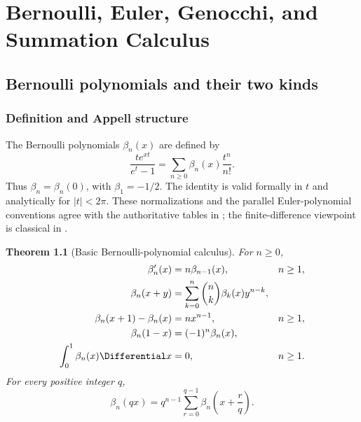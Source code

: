 \documentclass[11pt,a4paper,oneside,openany]{book}
\newtheorem{theorem}{Theorem}[chapter]
\theoremstyle{definition}
\theoremstyle{remark}
\begin{document}
\part{Bernoulli, Euler, Genocchi, and Summation Calculus}
\label{part:classical-polynomials}

\chapter{Bernoulli polynomials and their two kinds}
\label{ch:bernoulli-polynomials}

\section{Definition and Appell structure}

The Bernoulli polynomials $\beta_n(x)$ are defined by
\begin{equation}\label{eq:new-bernoulli-egf}
 \frac{t e^{xt}}{e^t-1}
 =\sum_{n\ge0}\beta_n(x)\frac{t^n}{n!}.
\end{equation}
Thus $\beta_n=\beta_n(0)$, with $\beta_1=-1/2$.  The identity is valid
formally in $t$ and analytically for $|t|<2\pi$.  These normalizations and the
parallel Euler-polynomial conventions agree with the authoritative tables in
\cite{NISTDLMF}; the finite-difference viewpoint is classical in
\cite{Norlund1924}.

\begin{theorem}[Basic Bernoulli-polynomial calculus]\label{thm:new-bernoulli-basic}
For $n\ge0$,
\begin{align}
 \beta_n'(x)&=n\beta_{n-1}(x), &&n\ge1,
 \label{eq:new-bernoulli-derivative}\\
 \beta_n(x+y)&=\sum_{k=0}^n\binom nk\beta_k(x)y^{n-k},
 \label{eq:new-bernoulli-addition}\\
 \beta_n(x+1)-\beta_n(x)&=nx^{n-1}, &&n\ge1,
 \label{eq:new-bernoulli-difference}\\
 \beta_n(1-x)&=(-1)^n\beta_n(x),
 \label{eq:new-bernoulli-reflection}\\
 \int_0^1\beta_n(x)\Differential x&=0, &&n\ge1.
 \label{eq:new-bernoulli-mean-zero}
\end{align}
For every positive integer $q$,
\begin{equation}\label{eq:new-bernoulli-multiplication}
 \beta_n(qx)=q^{n-1}\sum_{r=0}^{q-1}
 \beta_n\left(x+\frac rq\right).
\end{equation}
\end{theorem}
\end{document}
